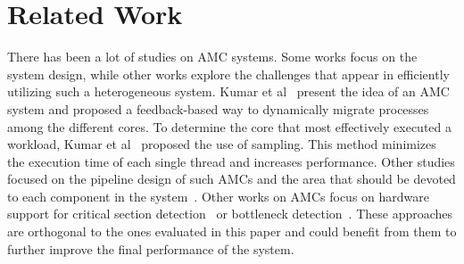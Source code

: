 \chapter{Related Work}


There has been a lot of studies on AMC systems. Some works focus on the system design, while other works explore the challenges that appear in efficiently utilizing such a heterogeneous system.
Kumar et al~\cite{Kumar_micro_2003} present the idea of an AMC system and proposed a feedback-based way to dynamically migrate processes among the different cores. 
To determine the core that most effectively executed a workload, Kumar et al~\cite{Kumar:ISCA2004} proposed the use of sampling. This method minimizes the execution time of each single thread and increases performance. Other studies focused on the pipeline design of such AMCs and the area that should be devoted to each component in the system~\cite{Balakrishnan:ISCA2005, Morad_area_based}. Other works on AMCs focus on hardware support for critical section detection~\cite{Suleman:APLOS2009} or bottleneck detection~\cite{Joao:ASPLOS2012,Joao:ISCA2013}.
These approaches are orthogonal to the ones evaluated in this paper and could benefit from them to further improve the final performance of the system.

